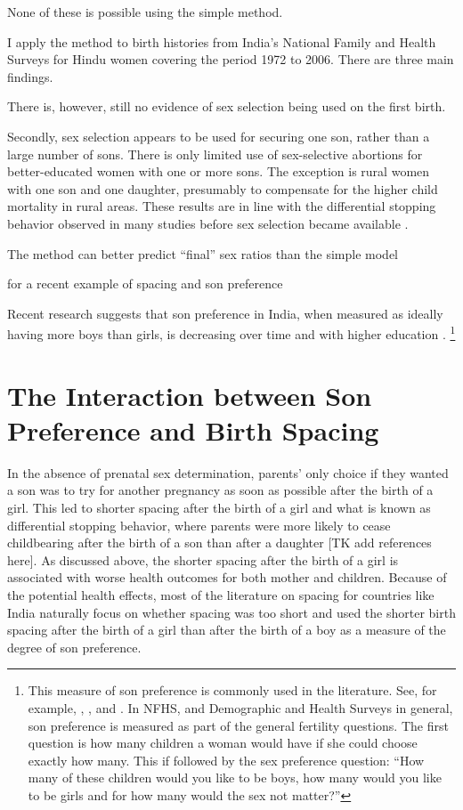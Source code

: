\documentclass[12pt,letterpaper]{article}
\begin{document}
None of these is possible using the simple method.

I apply the method to birth histories from India's National Family and Health Surveys 
for Hindu women covering the period 1972 to 2006. 
There are three main findings.

There is, however, still no evidence of sex selection being used on the first birth.

Secondly, sex selection appears to be used for securing one son, rather than a large 
number of sons.
There is only limited use of sex-selective abortions for better-educated
women with one or more sons.
The exception is rural women with one son and one daughter, presumably to compensate for 
the higher child mortality in rural areas.
These results are in line with the differential stopping behavior observed in many studies
before sex selection became available \citep{repetto72,arnold98,dreze01}.



The method can better predict ``final'' sex ratios than the simple model


\citep{Soest2012} for a recent example of spacing and son preference


Recent research suggests that son preference in India, when measured as ideally having 
more boys than girls, is decreasing over time and with higher education \citep{bhat03,pande07}.%
\footnote{
This measure of son preference is commonly used in the literature. 
See, for example, \citet{clark00}, \citet{Jensen2009}, and \cite{Hu2015}.
In NFHS, and Demographic and Health Surveys in general, son preference is measured as part 
of the general fertility questions.
The first question is how many children a woman would have if she could choose exactly how 
many.
This if followed by the sex preference question:
``How many of these children would you like to be boys, how many would you like to be girls 
and for how many would the sex not matter?''
}


\section{The Interaction between Son Preference and Birth Spacing\label{sec:model}}

In the absence of prenatal sex determination, parents' only choice if they 
wanted a son was to try for another pregnancy as soon as possible after
the birth of a girl. 
This led to shorter spacing after the birth of a girl and what
is known as differential stopping behavior, where parents were 
more likely to cease childbearing after the birth of a son than
after a daughter [TK add references here]. 
As discussed above, the shorter spacing after the birth of a girl is 
associated with worse health outcomes for both mother and children.
Because of the potential health effects, most of the literature on spacing 
for countries like India naturally focus on whether spacing was too short
and used the shorter birth spacing after the birth of a girl than after the
birth of a boy as a measure of the degree of son preference.
\end{document}
